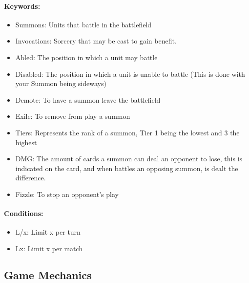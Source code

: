 \documentclass[12pt, letterpaper]{article}
\begin{document}
\paragraph{Keywords: }
\begin{itemize}
    \item Summons: Units that battle in the battlefield
    \item Invocations: Sorcery that may be cast to gain benefit. 
    \item Abled: The position in which a unit may battle 
    \item Disabled: The position in which a unit is unable to battle (This is done with your Summon being sideways)
    \item Demote: To have a summon leave the battlefield
    \item Exile: To remove from play a summon
    \item Tiers: Represents the rank of a summon, Tier 1 being the lowest and 3 the highest
    \item DMG: The amount of cards a summon can deal an opponent to lose, this is indicated on the card, and when battles an opposing summon, is dealt the difference.
    \item Fizzle: To stop an opponent's play 
\end{itemize}
\paragraph{Conditions:}
\begin{itemize}
    \item L/x: Limit x per turn
    \item Lx: Limit x per match
\end{itemize}
\newpage
\subsection{Game Mechanics}
\end{document}
